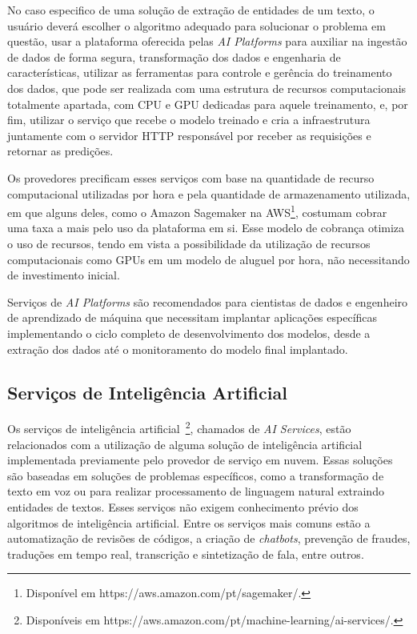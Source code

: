 \documentclass{SBCbookchapter}
\begin{document}
No caso especifico de uma solução de extração de entidades de um texto, o usuário deverá escolher o algoritmo adequado para solucionar o problema em questão, usar a plataforma oferecida pelas \textit{AI Platforms} para auxiliar na ingestão de dados de forma segura, transformação dos dados e engenharia de características, utilizar as ferramentas para controle e gerência do treinamento dos dados, que pode ser realizada com uma estrutura de recursos computacionais totalmente apartada, com CPU e  GPU dedicadas para aquele treinamento, e, por fim, utilizar o serviço que recebe o modelo treinado e cria a infraestrutura juntamente com o servidor HTTP responsável por receber as requisições e retornar as predições.

Os provedores precificam esses serviços com base na quantidade de recurso computacional utilizadas por hora e pela quantidade de armazenamento utilizada, em que alguns deles, como o Amazon Sagemaker na AWS\footnote{Disponível em https://aws.amazon.com/pt/sagemaker/.}, costumam cobrar uma taxa a mais pelo uso da plataforma em si. Esse modelo de cobrança otimiza o uso de recursos, tendo em vista a possibilidade da utilização de recursos computacionais como GPUs em um modelo de aluguel por hora, não necessitando de investimento inicial.

Serviços de \textit{AI Platforms} são recomendados para cientistas de dados e engenheiro de aprendizado de máquina que necessitam implantar aplicações específicas implementando o ciclo completo de desenvolvimento dos modelos, desde a extração dos dados até o monitoramento do modelo final implantado.

\subsection{Serviços de Inteligência Artificial}

Os serviços de inteligência artificial~\footnote{Disponíveis em https://aws.amazon.com/pt/machine-learning/ai-services/.}, chamados de \textit{AI Services}, estão relacionados com a utilização de alguma solução de inteligência artificial implementada previamente pelo provedor de serviço em nuvem. Essas soluções são baseadas em soluções de problemas específicos, como a transformação de texto em voz ou para realizar processamento de linguagem natural extraindo entidades de textos. Esses serviços não exigem conhecimento prévio dos algoritmos de inteligência artificial. Entre os serviços mais comuns estão a automatização de revisões de códigos, a criação de \textit{chatbots}, prevenção de fraudes, traduções em tempo real, transcrição e sintetização de fala, entre outros.
\end{document}
